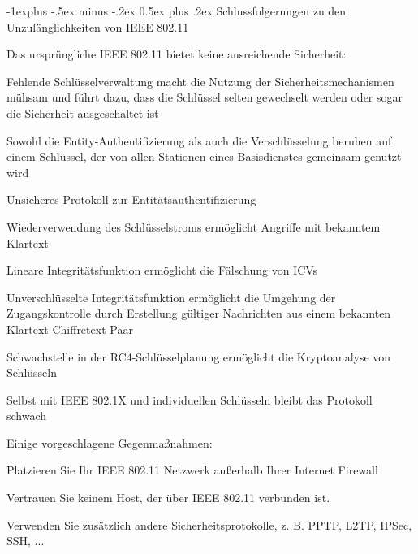 \documentclass[a4paper]{article}
\makeatletter
\renewcommand{\subsection}{\@startsection{subsection}{2}{0mm}%
 {-1explus -.5ex minus -.2ex}%
 {0.5ex plus .2ex}%
 {\normalfont\normalsize\bfseries}}
\makeatother
\begin{document}
\begin{multicols}{3}
      \subsection{Schlussfolgerungen zu den Unzulänglichkeiten von IEEE 802.11}
      \begin{itemize*}
            \item Das ursprüngliche IEEE 802.11 bietet keine ausreichende Sicherheit:
            \begin{itemize*}
                  \item Fehlende Schlüsselverwaltung macht die Nutzung der Sicherheitsmechanismen mühsam und führt dazu, dass die Schlüssel selten gewechselt werden oder sogar die Sicherheit ausgeschaltet ist
                  \item Sowohl die Entity-Authentifizierung als auch die Verschlüsselung beruhen auf einem Schlüssel, der von allen Stationen eines Basisdienstes gemeinsam genutzt wird
                  \item Unsicheres Protokoll zur Entitätsauthentifizierung
                  \item Wiederverwendung des Schlüsselstroms ermöglicht Angriffe mit bekanntem Klartext
                  \item Lineare Integritätsfunktion ermöglicht die Fälschung von ICVs
                  \item Unverschlüsselte Integritätsfunktion ermöglicht die Umgehung der Zugangskontrolle durch Erstellung gültiger Nachrichten aus einem bekannten Klartext-Chiffretext-Paar
                  \item Schwachstelle in der RC4-Schlüsselplanung ermöglicht die Kryptoanalyse von Schlüsseln
            \end{itemize*}
            \item Selbst mit IEEE 802.1X und individuellen Schlüsseln bleibt das Protokoll schwach
            \item Einige vorgeschlagene Gegenmaßnahmen:
            \begin{itemize*}
                  \item Platzieren Sie Ihr IEEE 802.11 Netzwerk außerhalb Ihrer Internet Firewall
                  \item Vertrauen Sie keinem Host, der über IEEE 802.11 verbunden ist.
                  \item Verwenden Sie zusätzlich andere Sicherheitsprotokolle, z. B. PPTP, L2TP, IPSec, SSH, ...
            \end{itemize*}
      \end{itemize*}


\end{multicols}
\end{document}
